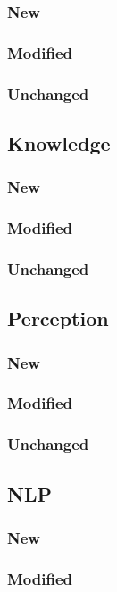 \documentclass[main.tex]{subfiles}
\begin{document}
                \subsubsection{New}
                \subsubsection{Modified}
                \subsubsection{Unchanged}
                \subsection{Knowledge}
                \subsubsection{New}
                \subsubsection{Modified}
                \subsubsection{Unchanged}
                \subsection{Perception}
                \subsubsection{New}
                \subsubsection{Modified}
                \subsubsection{Unchanged}
                \subsection{NLP}
                \subsubsection{New}
                \subsubsection{Modified}
\end{document}
